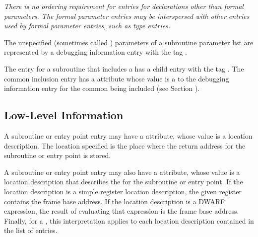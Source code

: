 \textit{There is no ordering requirement for entries for declarations
other than formal parameters. The formal parameter
entries may be interspersed with other entries used by formal
parameter entries, such as type entries.}

The unspecified (sometimes called ) 
parameters of a subroutine parameter list are
represented by a debugging information 
entry
with the tag \DWTAGunspecifiedparametersTARG.

The entry for a subroutine that includes a
has a child entry with the 
tag \DWTAGcommoninclusionTARG. 
The
\hypertarget{chap:commonreferencecommonblockusage}{}
common inclusion entry has a 
\DWATcommonreference{} attribute
whose value is a  
to the debugging information entry
for the common  being included 
(see Section ).

\subsection{Low-Level Information}
\label{chap:lowlevelinformation}

A 
\hypertarget{chap:DWATreturnaddrsubroutinereturnaddresssavelocation}{}
subroutine or entry point entry may have 
a 
\DWATreturnaddr{}
attribute, whose value is a location description. The location
specified is the place where the return address for the
subroutine or entry point is stored.

A 
\hypertarget{chap:DWATframebasesubroutineframebaseaddress}{}
subroutine or entry point entry may also have 
a
\DWATframebase{} attribute, whose value is a location
description that describes the  for the
subroutine or entry point. If the location description is
a simple register location description, the given register
contains the frame base address. If the location description is
a DWARF expression, the result of evaluating that expression
is the frame base address. Finally, for a 
,
this interpretation applies to each location description
contained in the list of  entries.

